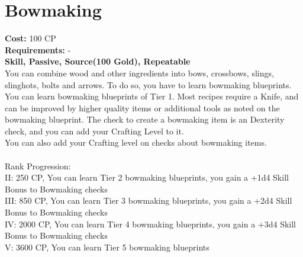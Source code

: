 \section{Bowmaking}\label{perk:bowmaking}
\textbf{Cost:} 100 CP\\
\textbf{Requirements:} -\\
\textbf{Skill, Passive, Source(100 Gold), Repeatable}\\
You can combine wood and other ingredients into bows, crossbows, slings, slinghots, bolts and arrows.
To do so, you have to learn bowmaking blueprints.
You can learn bowmaking blueprints of Tier 1.
Most recipes require a Knife, and can be improved by higher quality items or additional tools as noted on the bowmaking blueprint.
The check to create a bowmaking item is an Dexterity check, and you can add your Crafting Level to it.\\
You can also add your Crafting level on checks about bowmaking items.\\
\\
Rank Progression:\\
II: 250 CP, You can learn Tier 2 bowmaking blueprints, you gain a +1d4 Skill Bonus to Bowmaking checks\\
III: 850 CP, You can learn Tier 3 bowmaking blueprints, you gain a +2d4 Skill Bonus to Bowmaking checks\\
IV: 2000 CP, You can learn Tier 4 bowmaking blueprints, you gain a +3d4 Skill Bonus to Bowmaking checks\\
V: 3600 CP, You can learn Tier 5 bowmaking blueprints\\